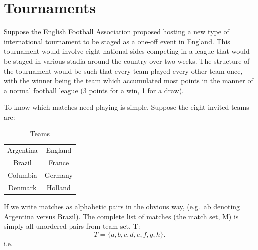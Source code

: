 \documentclass[
  12pt,
  a4paper]{book}
\begin{document}
\hypertarget{tournaments}{%
\section{Tournaments}\label{tournaments}}

Suppose the English Football Association proposed hosting a new type of
international tournament to be staged as a one-off event in England.
This tournament would involve eight national sides competing in a league
that would be staged in various stadia around the country over two
weeks. The structure of the tournament would be such that every team
played every other team once, with the winner being the team which
accumulated most points in the manner of a normal football league (3
points for a win, 1 for a draw).

To know which matches need playing is simple. Suppose the eight invited
teams are:

\begin{longtable}[]{@{}cc@{}}
\caption{Teams}\tabularnewline
\toprule
\endhead
\begin{minipage}[t]{0.16\columnwidth}\centering
Argentina\strut
\end{minipage} & \begin{minipage}[t]{0.16\columnwidth}\centering
England\strut
\end{minipage}\tabularnewline
\begin{minipage}[t]{0.16\columnwidth}\centering
Brazil\strut
\end{minipage} & \begin{minipage}[t]{0.16\columnwidth}\centering
France\strut
\end{minipage}\tabularnewline
\begin{minipage}[t]{0.16\columnwidth}\centering
Columbia\strut
\end{minipage} & \begin{minipage}[t]{0.16\columnwidth}\centering
Germany\strut
\end{minipage}\tabularnewline
\begin{minipage}[t]{0.16\columnwidth}\centering
Denmark\strut
\end{minipage} & \begin{minipage}[t]{0.16\columnwidth}\centering
Holland\strut
\end{minipage}\tabularnewline
\bottomrule
\end{longtable}

If we write matches as alphabetic pairs in the obvious way, (e.g.~ab
denoting Argentina versus Brazil). The complete list of matches (the
match set, M) is simply all unordered pairs from team set, T:
\[T = \{a, b, c, d, e, f, g, h\}.\] i.e.~
\end{document}
